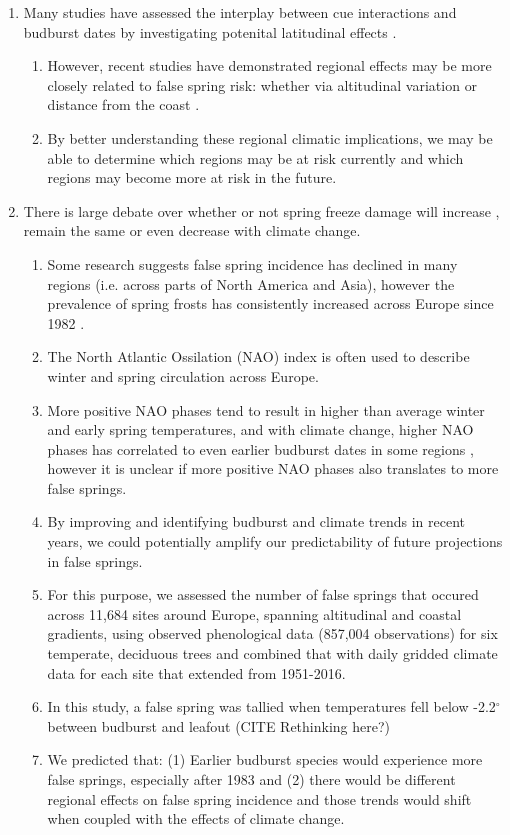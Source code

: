 \documentclass{article}\usepackage[]{graphicx}\usepackage[]{color}
\begin{document}
\begin{enumerate}
\item Many studies have assessed the interplay between cue interactions and budburst dates by investigating potenital latitudinal effects \citep{Partanen2004, Viheraaarnio2006, Caffarra2011, Zohner2016, Gauzere2017}.
\begin{enumerate}
\item However, recent studies have demonstrated regional effects may be more closely related to false spring risk: whether via altitudinal variation \citep{Vitra2017} or distance from the coast \citep{Wypych2016a}.
\item By better understanding these regional climatic implications, we may be able to determine which regions may be at risk currently and which regions may become more at risk in the future.
\end{enumerate}


\item There is large debate over whether or not spring freeze damage will increase \citep{Hannenin1991, Augspurger2013, Labe2016}, remain the same \citep{Scheifinger2003} or even decrease \citep{Kramer1994} with climate change.
\begin{enumerate}
\item Some research suggests false spring incidence has declined in many regions (i.e. across parts of North America and Asia), however the prevalence of spring frosts has consistently increased across Europe since 1982 \citep{Liu2018}.
\item The North Atlantic Ossilation (NAO) index is often used to describe winter and spring circulation across Europe. 
\item More positive NAO phases tend to result in higher than average winter and early spring temperatures, and with climate change, higher NAO phases has correlated to even earlier budburst dates in some regions \citep{Chmielewski2001}, however it is unclear if more positive NAO phases also translates to more false springs.
\item By improving and identifying budburst and climate trends in recent years, we could potentially amplify our predictability of future projections in false springs.
\item For this purpose, we assessed the number of false springs that occured across 11,684 sites around Europe, spanning altitudinal and coastal gradients, using observed phenological data (857,004 observations) for six temperate, deciduous trees and combined that with daily gridded climate data for each site that extended from 1951-2016. %
\item In this study, a false spring was tallied when temperatures fell below -2.2$^{\circ}$ \citep{Schwartz1993} between budburst and leafout (CITE Rethinking here?)
\item We predicted that: (1) Earlier budburst species would experience more false springs, especially after 1983 and (2) there would be different regional effects on false spring incidence and those trends would shift when coupled with the effects of climate change.
\end{enumerate}
\end{enumerate}
\end{document}
